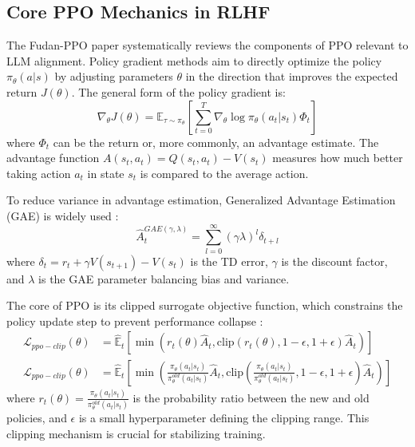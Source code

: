 \documentclass{article}
\begin{document}
\subsection{Core PPO Mechanics in RLHF}
The Fudan-PPO paper systematically reviews the components of PPO relevant to LLM alignment.
Policy gradient methods aim to directly optimize the policy $\pi_\theta(a|s)$ by adjusting parameters $\theta$ in the direction that improves the expected return $J(\theta)$. \cite{Zheng2023PPO} The general form of the policy gradient is:
\begin{equation}
    \label{eq:policy_gradient}
    \nabla_\theta J(\theta) = \mathbb{E}_{\tau \sim \pi_\theta} \left[ \sum_{t=0}^{T} \nabla_\theta \log \pi_\theta(a_t|s_t) \Phi_t \right]
\end{equation}
where $\Phi_t$ can be the return or, more commonly, an advantage estimate. The advantage function $A(s_t, a_t) = Q(s_t, a_t) - V(s_t)$ measures how much better taking action $a_t$ in state $s_t$ is compared to the average action. \cite{Zheng2023PPO}

To reduce variance in advantage estimation, Generalized Advantage Estimation (GAE) is widely used \cite{Zheng2023PPO}:
\begin{equation}
    \label{eq:gae}
    \hat{A}_t^{GAE(\gamma,\lambda)} = \sum_{l=0}^{\infty} (\gamma\lambda)^l \delta_{t+l}
\end{equation}
where $\delta_t = r_t + \gamma V(s_{t+1}) - V(s_t)$ is the TD error, $\gamma$ is the discount factor, and $\lambda$ is the GAE parameter balancing bias and variance.

The core of PPO is its clipped surrogate objective function, which constrains the policy update step to prevent performance collapse \cite{Zheng2023PPO}:
\begin{equation}
    \begin{split}
    \label{eq:ppo_clip}
    \mathcal{L}_{ppo-clip}(\theta) & =
    \hat{\mathbb{E}}_{t}\left[\min \left(r_t(\theta)\hat{A}_{t}, \text{clip}\left(r_t(\theta),1-\epsilon,1+\epsilon\right)\hat{A}_{t}\right)\right]
    \\
    \mathcal{L}_{ppo-clip}(\theta) & =
    \hat{\mathbb{E}}_{t}\left[\min \left(\frac{\pi_\theta(a_t | s_t)}{\pi_\theta^{old}(a_t | s_t)}\hat{A}_{t}, \text{clip}\left(\frac{\pi_\theta(a_t | s_t)}{\pi_\theta^{old}(a_t | s_t)},1-\epsilon,1+\epsilon\right)\hat{A}_{t}\right)\right]
    \end{split}
\end{equation}
where $r_t(\theta) = \frac{\pi_\theta(a_t|s_t)}{\pi_\theta^{old}(a_t|s_t)}$ is the probability ratio between the new and old policies, and $\epsilon$ is a small hyperparameter defining the clipping range. This clipping mechanism is crucial for stabilizing training.
\end{document}
